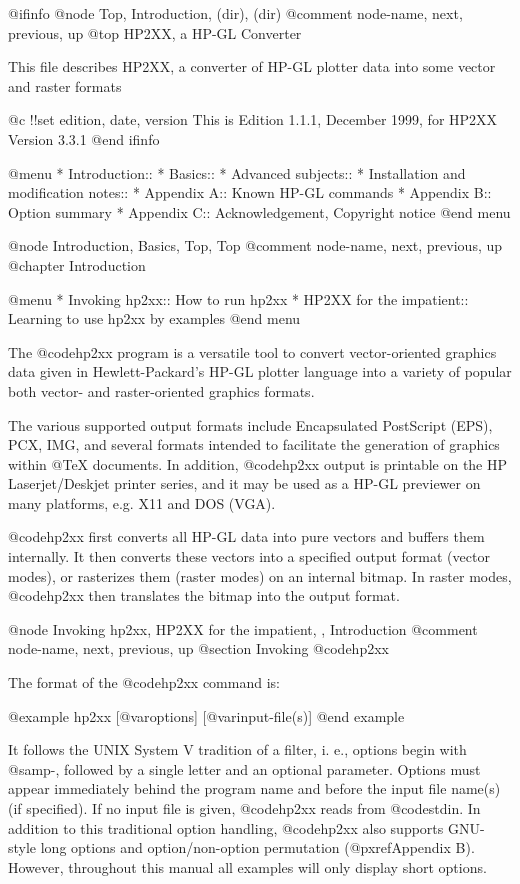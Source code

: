@ifinfo
@node Top, Introduction, (dir), (dir)
@comment  node-name,  next,  previous,  up
@top HP2XX, a HP-GL Converter

This file describes HP2XX, a converter of HP-GL plotter data into
some vector and raster formats

@c !!set edition, date, version
This is Edition 1.1.1, December 1999, for HP2XX Version 3.3.1
@end ifinfo


@menu
* Introduction::
* Basics::
* Advanced subjects::
* Installation and modification notes::
* Appendix A::                          Known HP-GL commands
* Appendix B::                          Option summary
* Appendix C::                          Acknowledgement, Copyright notice
@end menu

@node Introduction, Basics, Top, Top
@comment  node-name,  next,  previous,  up
@chapter Introduction

@menu
* Invoking hp2xx::          How to run hp2xx
* HP2XX for the impatient:: Learning to use hp2xx by examples
@end menu

The @code{hp2xx} program is a versatile tool to convert vector-oriented
graphics data given in Hewlett-Packard's HP-GL plotter language
into a variety of popular both vector- and raster-oriented graphics formats.

The various supported output formats include Encapsulated PostScript (EPS),
PCX, IMG, and several formats intended to facilitate the generation of
graphics within @TeX{} documents.
In addition, @code{hp2xx} output is printable on the HP Laserjet/Deskjet
printer series, and it may be used as a HP-GL previewer on many
platforms, e.g. X11 and DOS (VGA).

@code{hp2xx} first converts all HP-GL data into pure vectors and buffers
them internally. It then converts these vectors into a specified output
format (vector modes), or rasterizes them (raster modes) on an internal
bitmap. In raster modes, @code{hp2xx} then translates the bitmap into the
output format.



@node Invoking hp2xx, HP2XX for the impatient, , Introduction
@comment  node-name,  next,  previous,  up
@section Invoking @code{hp2xx}

The format of the @code{hp2xx} command is:

@example
hp2xx [@var{options}] [@var{input-file(s)}]
@end example

It follows the UNIX System V tradition of a filter, i. e., options begin
with @samp{-}, followed by a single letter and an optional parameter.
Options must appear immediately behind the program name and before the input
file name(s) (if specified). If no input file is given, @code{hp2xx} reads
from @code{stdin}. In addition to this traditional option handling,
@code{hp2xx} also supports GNU-style long options and option/non-option
permutation (@pxref{Appendix B}). However, throughout this manual
all examples will only display short options.

